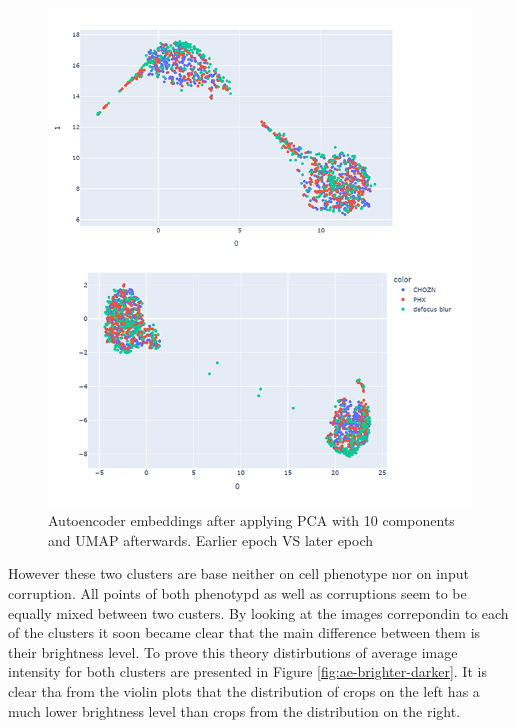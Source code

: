 \begin{figure}[htb]
	\begin{center}
		\includegraphics[width=0.8\linewidth]{bilder/ae-embeddings/pca-umap-clusters.png}
		\caption{Autoencoder embeddings after applying PCA with 10 components and UMAP afterwards. Earlier epoch VS later epoch}\label{fig:ae-pca-umap-clustered}
	\end{center}
\end{figure}

However these two clusters are base neither on cell phenotype nor on input corruption. All points of both phenotypd as well as corruptions seem to be equally mixed between two custers. By looking at the images correpondin to each of the clusters it soon became clear that the main difference between them is their brightness level. To prove this theory distirbutions of average image intensity for both clusters are presented in Figure \ref{fig:ae-brighter-darker}. It is clear tha from the violin plots that the distribution of crops on the left has a much lower brightness level than crops from the distribution on the right.

